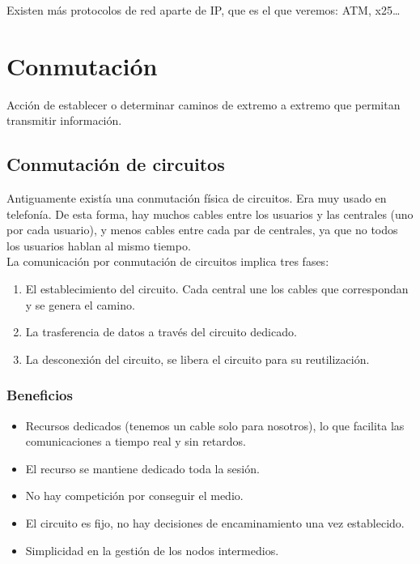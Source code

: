 Existen más protocolos de red aparte de \acrshort{IP}\@, que es el que veremos: \acrshort{ATM}\@, x25\ldots

\section{Conmutación}

\begin{definicion}[Conmutación]
    Acción de establecer o determinar caminos de extremo a extremo que permitan transmitir información.         
\end{definicion}

\subsection{Conmutación de circuitos}

Antiguamente existía una conmutación física de circuitos. Era muy usado en telefonía. De esta forma, hay muchos cables entre los usuarios y las centrales (uno por cada usuario), y menos cables entre cada par de centrales, ya que no todos los usuarios hablan al mismo tiempo. \\

La comunicación por conmutación de circuitos implica tres fases:
\begin{enumerate}
    \item El establecimiento del circuito. Cada central une los cables que correspondan y se genera el camino. 
    \item La trasferencia de datos a través del circuito dedicado.
    \item La desconexión del circuito, se libera el circuito para su reutilización.
\end{enumerate}

\subsubsection{Beneficios}
\begin{itemize}
    \item Recursos dedicados (tenemos un cable solo para nosotros), lo que facilita las comunicaciones a tiempo real y sin retardos.
    \item El recurso se mantiene dedicado toda la sesión.
    \item No hay competición por conseguir el medio.
    \item El circuito es fijo, no hay decisiones de encaminamiento una vez establecido.
    \item Simplicidad en la gestión de los nodos intermedios.
\end{itemize}

